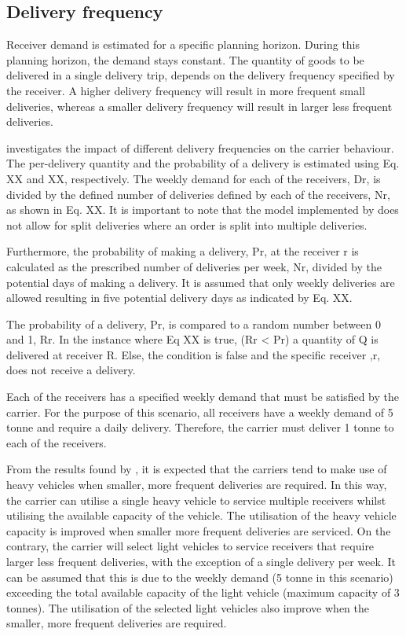 \subsection{Delivery frequency}
Receiver demand is estimated for a specific planning horizon. During this planning horizon, the demand stays constant. The quantity of goods to be delivered in a single delivery trip, depends on the delivery frequency specified by the receiver. A higher delivery frequency will result in more frequent small deliveries, whereas a smaller delivery frequency will result in larger less frequent deliveries. \par

\citet{bean2019behavioural} investigates the impact of different delivery frequencies on the carrier behaviour.  The per-delivery quantity and the probability of a delivery is estimated using Eq. XX and XX, respectively. The weekly demand for each of the receivers, Dr, is divided by the defined number of deliveries defined by each of the receivers, Nr, as shown in Eq. XX. It is important to note that the model implemented by \citet{bean2019behavioural}does not allow for split deliveries where an order is split into multiple deliveries.

Furthermore, the probability of making a delivery, Pr, at the receiver r is calculated as the prescribed number of deliveries per week, Nr, divided by the potential days of making a delivery. It is assumed that only weekly deliveries are allowed resulting in five potential delivery days as indicated by Eq. XX.

The probability of a delivery, Pr, is compared to a random number between 0 and 1, Rr. In the instance where Eq XX is true, (Rr < Pr) a quantity of Q is delivered at receiver R. Else, the condition is false and the specific receiver ,r, does not receive a delivery.\par

Each of the receivers has a specified weekly demand that must be satisfied by the carrier. For the purpose of this scenario, all receivers have a weekly demand of 5 tonne and require a daily delivery. Therefore, the carrier must deliver 1 tonne to each of the receivers.

From the results found by \citet{bean2019behavioural}, it is expected that the carriers tend to make use of heavy vehicles when smaller, more frequent deliveries are required. In this way, the carrier can utilise a single heavy vehicle to service multiple receivers whilst utilising the available capacity of the vehicle. The utilisation of the heavy vehicle capacity is improved when smaller more frequent deliveries are serviced. On the contrary, the carrier will select light vehicles to service receivers that require larger less frequent deliveries, with the exception of a single delivery per week. It can be assumed that this is due to the weekly demand (5 tonne in this scenario) exceeding the total available capacity of the light vehicle (maximum capacity of 3 tonnes). The utilisation of the selected light vehicles also improve when the smaller, more frequent deliveries are required. \par

